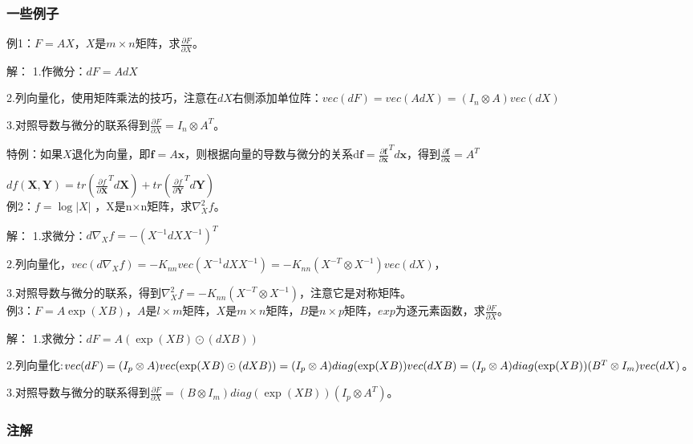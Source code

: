 \documentclass[UTF8]{ctexart}
\begin{document}
		\subsubsection*{一些例子}
		\noindent 例1：$F = AX$，$X$是$m×n$矩阵，求$\frac{\partial F}{\partial X}$。

		\noindent 解：
		1.作微分：$dF=AdX$

		2.列向量化，使用矩阵乘法的技巧，注意在$dX$右侧添加单位阵：${vec}(dF) = {vec}(AdX) = (I_n\otimes A){vec}(dX)$

		3.对照导数与微分的联系得到$\frac{\partial F}{\partial X} = I_n\otimes A^T$。

		特例：如果$X$退化为向量，即$\boldsymbol{f} = A \boldsymbol{x}$，则根据向量的导数与微分的关系d$\boldsymbol{f} = \frac{\partial \boldsymbol{f}}{\partial \boldsymbol{x}}^T d\boldsymbol{x}$，得到$\frac{\partial \boldsymbol{f}}{\partial \boldsymbol{x}} = A^T$

		$df(\mathbf{X},\mathbf{Y}) = tr(\frac{\partial f}{\partial \mathbf{X}}^T d\mathbf{X}) + tr(\frac{\partial f}{\partial \mathbf{Y}}^T d\mathbf{Y})$\\

		\noindent 例2：$f = \log |X|$ ，X是n×n矩阵，求$\nabla^2_X f$。

		\noindent 解：
		1.求微分：$d\nabla_X f = -(X^{-1}dXX^{-1})^T$

		2.列向量化，${vec}(d\nabla_X f)= -K_{nn}{vec}(X^{-1}dX X^{-1}) = -K_{nn}(X^{-T}\otimes X^{-1}){vec}(dX)$，

		3.对照导数与微分的联系，得到$\nabla^2_X f = -K_{nn}(X^{-T}\otimes X^{-1})$，注意它是对称矩阵。\\


		\noindent 例3：$F = A\exp(XB)，A$是$l×m$矩阵，$X$是$m×n$矩阵，$B$是$n×p$矩阵，$exp$为逐元素函数，求$\frac{\partial F}{\partial X}$。

		\noindent 解：
		1.求微分：$dF = A(\exp(XB)\odot (dXB))$

		2.列向量化:${vec}(dF) = (I_p\otimes A){vec}(\exp(XB)\odot (dXB)) = \\(I_p \otimes A) {diag}(\exp(XB)){vec}(dXB) = (I_p\otimes A){diag}(\exp(XB))(B^T\otimes I_m){vec}(dX)$。

		3.对照导数与微分的联系得到$\frac{\partial F}{\partial X} = (B\otimes I_m){diag}(\exp(XB))(I_p\otimes A^T)$。

		\subsubsection*{注解}
\end{document}
